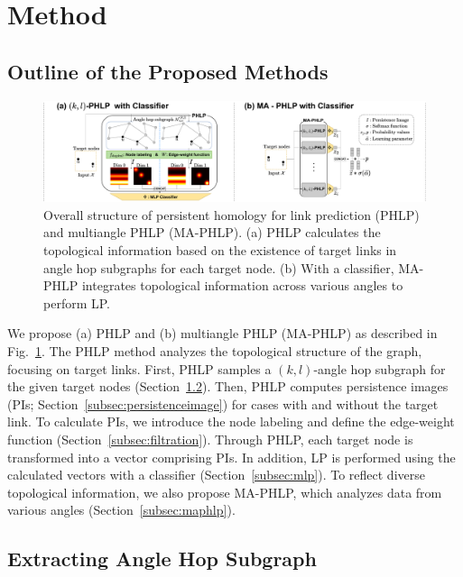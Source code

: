 \section{Method}
\subsection{Outline of the Proposed Methods}
\begin{figure}[!htbp]
\centering
\includegraphics[width=18cm]{figures/PHLP.drawio.pdf}
\caption{Overall structure of persistent homology for link prediction (PHLP) and multiangle PHLP (MA-PHLP). (a) PHLP calculates the topological information based on the existence of target links in angle hop subgraphs for each target node. (b) With a classifier, MA-PHLP integrates topological information across various angles to perform LP. }
\label{fig:pipeline}
\end{figure}

We propose (a) PHLP and (b) multiangle PHLP (MA-PHLP) as described in Fig.~\ref{fig:pipeline}. 
The PHLP method analyzes the topological structure of the graph, focusing on target links.
First, PHLP samples a $(k,l)$-angle hop subgraph for the given target nodes (Section~\ref{subsec:anglehop}). 
Then, PHLP computes persistence images (PIs; Section~\ref{subsec:persistenceimage}) for cases with and without the target link. 
To calculate PIs, we introduce the node labeling and define the edge-weight function (Section~\ref{subsec:filtration}).
Through PHLP, each target node is transformed into a vector comprising PIs.
In addition, LP is performed using the calculated vectors
with a classifier (Section~\ref{subsec:mlp}). 
To reflect diverse topological information, we also propose MA-PHLP, which analyzes data from various angles (Section~\ref{subsec:maphlp}).


\subsection{Extracting Angle Hop Subgraph}
\label{subsec:anglehop}

